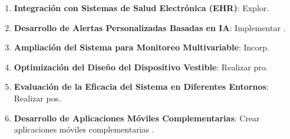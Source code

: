\begin{enumerate}
    \item \textbf{Integración con Sistemas de Salud Electrónica (EHR)}:
    Explor.

    \item \textbf{Desarrollo de Alertas Personalizadas Basadas en IA}:
    Implementar .

    \item \textbf{Ampliación del Sistema para Monitoreo Multivariable}:
    Incorp.

    \item \textbf{Optimización del Diseño del Dispositivo Vestible}:
    Realizar pro.

    \item \textbf{Evaluación de la Eficacia del Sistema en Diferentes Entornos}:
    Realizar pos.

    \item \textbf{Desarrollo de Aplicaciones Móviles Complementarias}:
    Crear aplicaciones móviles complementarias .


\end{enumerate}
